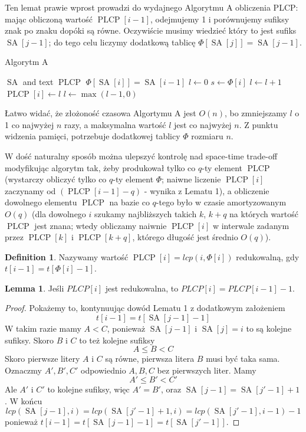 \documentclass[a4paper,12pt]{article}
\theoremstyle{definition}
\newtheorem{definition}{Definition}[section]
\newtheorem{lemma}{Lemma}[section]
\DeclareMathOperator{\SA}{SA}
\DeclareMathOperator{\PLCP}{PLCP}
\begin{document}
Ten lemat prawie wprost prowadzi do wydajnego Algorytmu A obliczenia PLCP: mając obliczoną wartość $\PLCP[i - 1]$, odejmujemy 1 i porównujemy sufiksy znak po znaku dopóki są równe. Oczywiście musimy wiedzieć który to jest sufiks $\SA[j - 1]$; do tego celu liczymy dodatkową tablicę $\Phi[\SA[j]] = \SA[j - 1]$.

\begin{algorithm}[H]
\caption{Algorytm A}
\begin{algorithmic} 
\REQUIRE $\SA$ and text
\ENSURE $\PLCP$
\STATE $\Phi[\SA[i]] = \SA[i - 1]$
\ENDFOR
\STATE $l \gets 0$
\STATE $s \gets \Phi[i]$
\STATE $l \gets l + 1$
\ENDWHILE
\STATE $\PLCP[i] \gets l$
\STATE $l \gets \max(l - 1, 0)$
\ENDFOR
\end{algorithmic}
\end{algorithm}

Łatwo widać, że złożoność czasowa Algortymu A jest $O(n)$, bo zmniejszamy $l$ o 1 co najwyżej $n$ razy, a maksymalna wartość $l$ jest co najwyżej $n$. Z punktu widzenia pamięci, potrzebuje dodatkowej tablicy $\Phi$ rozmiaru $n$.
\par
W dość naturalny sposób można ulepszyć kontrolę nad space-time trade-off modyfikując algorytm tak, żeby produkował tylko co $q$-ty element $\PLCP$ (wystarczy obliczyć tylko co $q$-ty element $\Phi$; naiwne liczenie $\PLCP[i]$ zaczynamy od $(\PLCP[i - 1] - q)$ - wynika z Lematu 1), a obliczenie dowolnego elementu $\PLCP$ na bazie co $q$-tego było w czasie amortyzowanym $O(q)$ (dla dowolnego $i$ szukamy najbliższych takich $k$, $k+q$ na których wartość $\PLCP$ jest znana; wtedy obliczamy naiwnie $\PLCP[i]$ w interwale zadanym przez $\PLCP[k]$ i $\PLCP[k + q]$, którego długość jest średnio $O(q)$).

\begin{definition}
Nazywamy wartość $\PLCP[i] = lcp(i, \Phi[i])$ redukowalną, gdy $t[i - 1] = t[\Phi[i] - 1]$.
\end{definition}

\begin{lemma}
Jeśli $PLCP[i]$ jest redukowalna, to $PLCP[i] = PLCP[i - 1] - 1$.
\begin{proof}
Pokażemy to, kontynuując dowód Lematu 1 z dodatkowym założeniem
\[
t[i - 1] = t[\SA[j - 1] - 1]
\]
W takim razie mamy $A < C$, ponieważ $\SA[j - 1]$ i $\SA[j] = i$ to są kolejne sufiksy. Skoro $B$ i $C$ to też kolejne sufiksy
\[
A \le B < C
\]
Skoro pierwsze litery $A$ i $C$ są równe, pierwsza litera $B$ musi być taka sama. Oznaczmy $A', B', C'$ odpowiednio $A, B, C$ bez pierwszych liter. Mamy
\[
A' \le B' < C'
\]
Ale $A'$ i $C'$ to kolejne sufiksy, więc $A' = B'$, oraz $\SA[j - 1] = \SA[j' - 1] + 1$. W końcu
\[
lcp(\SA[j - 1], i) = lcp(\SA[j' - 1] + 1, i) = lcp(\SA[j' - 1], i - 1) - 1
\]
ponieważ $t[i - 1] = t[\SA[j - 1] - 1] = t[\SA[j' - 1]]$.
\end{proof}
\end{lemma}
\end{document}
